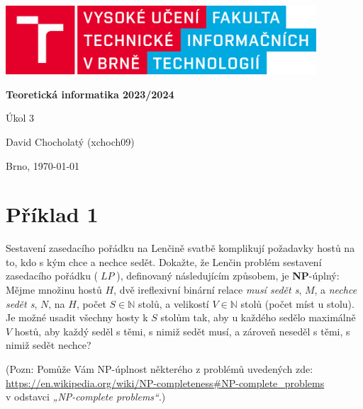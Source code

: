\documentclass[a4paper, 12pt]{article}
\newcommand\lp{\mathop{\mbox{$\mathit{LP}$}}}
\theoremstyle{definition}
\theoremstyle{definition}
\theoremstyle{definition}
\theoremstyle{remark}
\theoremstyle{remark}
\theoremstyle{remark}
\theoremstyle{remark}
\begin{document}
    \begin{titlepage}
        \begin{center}
            \includegraphics[width=0.87\textwidth]{logo_cz.png}
            \vspace*{6cm}

            \Huge{\textbf{Teoretická informatika 2023/2024}}
            \vspace{0.5cm}
            
            \LARGE{Úkol 3}
            \vspace{1cm}
            
            \Large{David Chocholatý (xchoch09)}
            
           \vfill
		   \begin{flushright} 
		   Brno, \today
		   \end{flushright}
        \end{center}
    \end{titlepage}

\pagestyle{fancy}

\section{Příklad 1}
Sestavení zasedacího pořádku na Lenčině svatbě komplikují požadavky hostů na to, kdo s kým chce a nechce sedět. Dokažte, že Lenčin problém sestavení zasedacího pořádku ($\lp$), definovaný následujícím způsobem, je \textbf{NP}-úplný: Mějme množinu hostů $H$, dvě ireflexivní binární relace \textit{musí sedět s}, $M$, a \textit{nechce sedět s}, $N$, na $H$, počet $S \in \mathbb{N}$ stolů, a velikostí $V \in \mathbb{N}$ stolů (počet míst u stolu). Je možné usadit všechny hosty k $S$ stolům tak, aby u každého sedělo maximálně $V$ hostů, aby každý seděl s těmi, s nimiž sedět musí, a zároveň neseděl s těmi, s nimiž sedět nechce?

\vspace{0.25cm}

\noindent
{\footnotesize (Pozn: Pomůže Vám NP-úplnost některého z problémů uvedených zde: \\
\url{https://en.wikipedia.org/wiki/NP-completeness#NP-complete_problems} \\
v odstavci \textit{„NP-complete problems“}.)}
\end{document}
